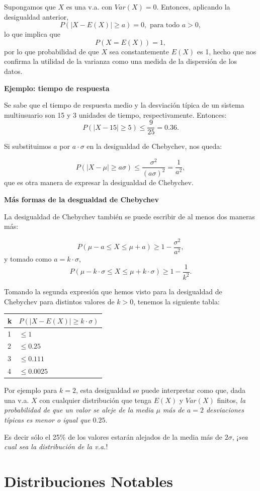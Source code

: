 \documentclass[]{book}
\begin{document}
Supongamos que \(X\) es una v.a. con \(Var(X)=0\). Entonces, aplicando la desigualdad anterior,
\[P(|X-E(X)|\geq a )=0,\mbox{ para todo }a>0,\]
lo que implica que
\[P(X=E(X))=1,\]
por lo que probabilidad de que \(X\) sea
constantemente \(E(X)\) es 1, hecho que nos confirma la utilidad de la varianza como una
medida de la dispersión de los datos.

\textbf{Ejemplo: tiempo de respuesta}

Se sabe que el tiempo de respuesta medio y la desviación típica de un sistema multiusuario son 15 y 3 unidades de tiempo, respectivamente. Entonces:
\[
P(|X-15|\geq 5)\leq \frac9{25}=0.36.
\]

Si substituimos \(a\) por \(a\cdot \sigma\) en la
desigualdad de Chebychev, nos queda:

\[
P(|X-\mu|\geq a \sigma)\leq
\frac{\sigma^2}{(a\sigma)^2}=\frac1{a^2},
\]
que es otra manera de expresar la desigualdad de Chebychev.

\textbf{Más formas de la desgualdad de Chebychev}

La desigualdad de Chebychev también se puede escribir de al menos dos maneras más:

\[
P(\mu-a\leq X\leq \mu+a)\geq 1-\frac{\sigma^2}{a^2},
\]
y tomado como \(a=k\cdot \sigma\),
\[
P(\mu-k\cdot \sigma\leq X\leq \mu+ k \cdot \sigma)\geq 1-\frac1{k^2}.
\]

Tomando la segunda expresión que hemos visto para la desigualdad de
Chebychev para distintos valores de \(k>0\), tenemos la siguiente tabla:

\begin{longtable}[]{@{}ll@{}}
\toprule
k & \(P(|X-E(X)|\geq k \cdot \sigma)\)\tabularnewline
\midrule
\endhead
1 & \(\leq 1\)\tabularnewline
2 & \(\leq 0.25\)\tabularnewline
3 & \(\leq 0.111\)\tabularnewline
4 & \(\leq 0.0025\)\tabularnewline
\bottomrule
\end{longtable}

Por ejemplo para \(k=2\), esta desigualdad se puede interpretar como que, dada una v.a. \(X\) con cualquier distribución que tenga \(E(X)\) y \(Var(X)\) finitos, \emph{la probabilidad de que un valor se aleje de la media \(\mu\) más de \(a=2\) desviaciones típicas es menor o igual que \(0.25\)}.

Es decir sólo el 25\% de los valores estarán alejados de la media
más de \(2\sigma\), ¡\emph{sea cual sea la distribución de la v.a.}!

\hypertarget{distribuciones-notables}{%
\chapter{Distribuciones Notables}\label{distribuciones-notables}}
\end{document}
